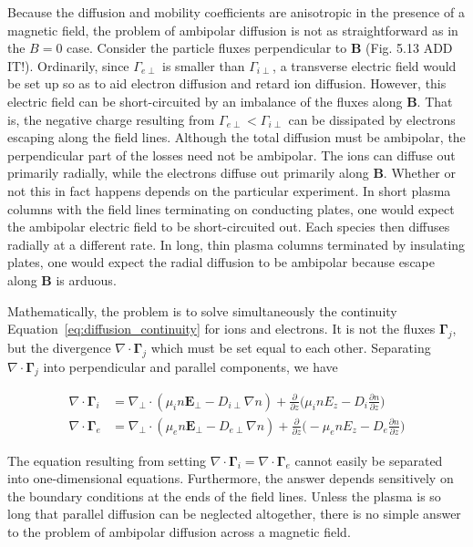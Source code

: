 \documentclass[
  notoc %
]{tufte-book}
\begin{document}
Because the diffusion and mobility coefficients are anisotropic in the
presence of a magnetic field, the problem of ambipolar diffusion is not
as straightforward as in the \(B = 0\) case. Consider the particle
fluxes perpendicular to \(\mathbf{B}\) (Fig. 5.13 ADD IT!). Ordinarily,
since \(\Gamma_{e\perp}\) is smaller than \(\Gamma_{i\perp}\), a
transverse electric field would be set up so as to aid electron
diffusion and retard ion diffusion. However, this electric field can be
short-circuited by an imbalance of the fluxes along \(\mathbf{B}\). That
is, the negative charge resulting from
\(\Gamma_{e\perp} < \Gamma_{i\perp}\) can be dissipated by electrons
escaping along the field lines. Although the total diffusion must be
ambipolar, the perpendicular part of the losses need not be ambipolar.
The ions can diffuse out primarily radially, while the electrons diffuse
out primarily along \(\mathbf{B}\). Whether or not this in fact happens
depends on the particular experiment. In short plasma columns with the
field lines terminating on conducting plates, one would expect the
ambipolar electric field to be short-circuited out. Each species then
diffuses radially at a different rate. In long, thin plasma columns
terminated by insulating plates, one would expect the radial diffusion
to be ambipolar because escape along \(\mathbf{B}\) is arduous.

Mathematically, the problem is to solve simultaneously the continuity
Equation~\ref{eq:diffusion_continuity} for ions and electrons. It is not
the fluxes \(\mathbf{\Gamma}_j\), but the divergence
\(\nabla\cdot\mathbf{\Gamma}_j\) which must be set equal to each other.
Separating \(\nabla\cdot\mathbf{\Gamma}_j\) into perpendicular and
parallel components, we have

\[
\begin{aligned}
\nabla\cdot\mathbf{\Gamma}_i &= \nabla_\perp\cdot(\mu_i n \mathbf{E}_\perp - D_{i\perp}\nabla n) + \frac{\partial}{\partial z}\Big( \mu_inE_z - D_i\frac{\partial n}{\partial z} \Big) \\
\nabla\cdot\mathbf{\Gamma}_e &= \nabla_\perp\cdot(\mu_e n \mathbf{E}_\perp - D_{e\perp}\nabla n) + \frac{\partial}{\partial z}\Big( -\mu_enE_z - D_e\frac{\partial n}{\partial z} \Big)
\end{aligned}
\]

The equation resulting from setting
\(\nabla\cdot\mathbf{\Gamma}_i = \nabla\cdot\mathbf{\Gamma}_e\) cannot
easily be separated into one-dimensional equations. Furthermore, the
answer depends sensitively on the boundary conditions at the ends of the
field lines. Unless the plasma is so long that parallel diffusion can be
neglected altogether, there is no simple answer to the problem of
ambipolar diffusion across a magnetic field.
\end{document}
